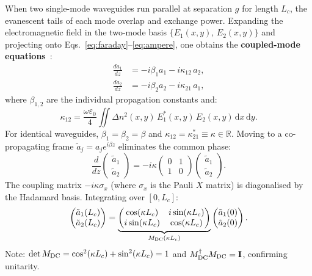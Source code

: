 \documentclass[12pt, a4paper]{article}
\newcommand{\RR}{\mathbb{R}}
\newcommand{\id}{\mathbf{I}}
\begin{document}
When two single-mode waveguides run parallel at separation $g$ for length $L_c$,
the evanescent tails of each mode overlap and exchange power.
Expanding the electromagnetic field in the two-mode basis
$\{E_1(x,y),\, E_2(x,y)\}$ and projecting onto
Eqs.~\eqref{eq:faraday}--\eqref{eq:ampere}, one obtains the
\textbf{coupled-mode equations}~\cite{haus1991}:
\begin{align}
  \frac{da_1}{dz} &= -i\beta_1 a_1 - i\kappa_{12}\,a_2, \label{eq:cmt_1}\\
  \frac{da_2}{dz} &= -i\beta_2 a_2 - i\kappa_{21}\,a_1, \label{eq:cmt_2}
\end{align}
where $\beta_{1,2}$ are the individual propagation constants and:
\begin{equation}
  \kappa_{12} = \frac{\omega\varepsilon_0}{4}\iint\Delta n^2(x,y)\,
  E_1^*(x,y)\,E_2(x,y)\,\mathrm{d}x\,\mathrm{d}y.
  \label{eq:kappa}
\end{equation}
For identical waveguides, $\beta_1=\beta_2=\beta$ and $\kappa_{12}=\kappa_{21}^*
\equiv\kappa\in\RR$.
Moving to a co-propagating frame $\tilde{a}_j = a_j e^{i\beta z}$ eliminates
the common phase:
\begin{equation}
  \frac{d}{dz}\begin{pmatrix}\tilde{a}_1\\\tilde{a}_2\end{pmatrix}
  = -i\kappa\begin{pmatrix}0&1\\1&0\end{pmatrix}
  \begin{pmatrix}\tilde{a}_1\\\tilde{a}_2\end{pmatrix}.
\end{equation}
The coupling matrix $-i\kappa\sigma_x$ (where $\sigma_x$ is the Pauli $X$
matrix) is diagonalised by the Hadamard basis.
Integrating over $[0,L_c]$:
\begin{equation}
  \begin{pmatrix}\tilde{a}_1(L_c)\\\tilde{a}_2(L_c)\end{pmatrix}
  = \underbrace{\begin{pmatrix}\cos(\kappa L_c) & i\sin(\kappa L_c)\\
    i\sin(\kappa L_c) & \cos(\kappa L_c)\end{pmatrix}}_{M_{\rm DC}(\kappa L_c)}
  \begin{pmatrix}\tilde{a}_1(0)\\\tilde{a}_2(0)\end{pmatrix}.
  \label{eq:dc_matrix}
\end{equation}
Note: $\det M_{\rm DC} = \cos^2(\kappa L_c)+\sin^2(\kappa L_c)=1$ and
$M_{\rm DC}^\dagger M_{\rm DC}=\id$, confirming unitarity.
\end{document}
